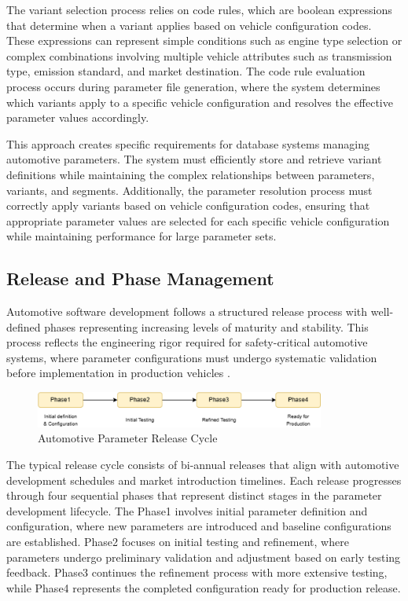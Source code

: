 The variant selection process relies on code rules, which are boolean expressions that determine when a variant applies based on vehicle configuration codes. These expressions can represent simple conditions such as engine type selection or complex combinations involving multiple vehicle attributes such as transmission type, emission standard, and market destination. The code rule evaluation process occurs during parameter file generation, where the system determines which variants apply to a specific vehicle configuration and resolves the effective parameter values accordingly.

This approach creates specific requirements for database systems managing automotive parameters. The system must efficiently store and retrieve variant definitions while maintaining the complex relationships between parameters, variants, and segments. Additionally, the parameter resolution process must correctly apply variants based on vehicle configuration codes, ensuring that appropriate parameter values are selected for each specific vehicle configuration while maintaining performance for large parameter sets.

\subsection{Release and Phase Management}
\label{subsec:release-phase-management}

Automotive software development follows a structured release process with well-defined phases representing increasing levels of maturity and stability. This process reflects the engineering rigor required for safety-critical automotive systems, where parameter configurations must undergo systematic validation before implementation in production vehicles \cite{broy2006challenges}.

\begin{figure}[ht]
    \centering
    \includegraphics[width=0.85\textwidth]{figures/release_cycle.png}
    \caption{Automotive Parameter Release Cycle}
    \label{fig:release-cycle}
\end{figure}

The typical release cycle consists of bi-annual releases that align with automotive development schedules and market introduction timelines. Each release progresses through four sequential phases that represent distinct stages in the parameter development lifecycle. The Phase1 involves initial parameter definition and configuration, where new parameters are introduced and baseline configurations are established. Phase2 focuses on initial testing and refinement, where parameters undergo preliminary validation and adjustment based on early testing feedback. Phase3 continues the refinement process with more extensive testing, while Phase4 represents the completed configuration ready for production release.

